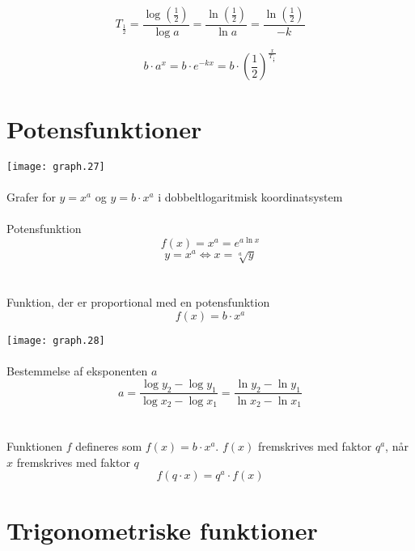 \documentclass[11pt,a5paper,fleqn,leqno]{book}
\begin{document}
\begin{equation}
T_{\frac{1}{2}} = \frac{\log\left(\frac{1}{2}\right)}{\log a} = \frac{\ln\left(\frac{1}{2}\right)}{\ln a} = \frac{\ln\left(\frac{1}{2}\right)}{-k}
\end{equation}

\begin{equation}
b \cdot a^x = b \cdot e^{-kx} = b \cdot \left(\frac{1}{2}\right)^{\frac{x}{T_{\frac{1}{2}}}}
\end{equation}

\newpage

\section{Potensfunktioner}

\texttt{[image: graph.27]}
\\
\\
Grafer for $y = x^a$ og $y = b \cdot x^a$ i dobbeltlogaritmisk koordinatsystem
\\
\\
Potensfunktion
\begin{equation}
f(x) = x^a = e^{a\ln x}
\end{equation}
\begin{equation}
y = x^a \Leftrightarrow x = \sqrt[a]{y}
\end{equation}
\\
\\
Funktion, der er proportional med en potensfunktion
\begin{equation}
f(x) = b \cdot x^a
\end{equation}

\newpage

\texttt{[image: graph.28]}
\\
\\
Bestemmelse af eksponenten $a$
\begin{equation}
a = \frac{\log y_2 - \log y_1}{\log x_2 - \log x_1} = \frac{\ln y_2 - \ln y_1}{\ln x_2 - \ln x_1}
\end{equation}
\\
\\
Funktionen $f$ defineres som $f(x) = b \cdot x^a$. $f(x)$ fremskrives med faktor $q^a$, når $x$ fremskrives med faktor $q$
\begin{equation}
f(q \cdot x) = q^a \cdot f(x)
\end{equation}

\vfill

\section{Trigonometriske funktioner}
\end{document}
